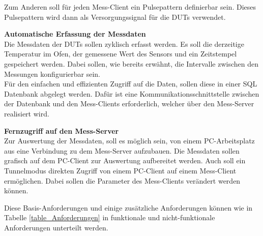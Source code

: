 Zum Anderen soll für jeden Mess-Client ein Pulsepattern definierbar sein. Dieses Pulsepattern wird dann als Versorgungssignal für die \acp{DUT} verwendet.

\textbf{Automatische Erfassung der Messdaten}\\
Die Messdaten der \acp{DUT} sollen zyklisch erfasst werden. Es soll die derzeitige Temperatur im Ofen, der gemessene Wert des Sensors und ein Zeitstempel gespeichert werden. Dabei sollen, wie bereits erwähnt, die Intervalle zwischen den Messungen konfigurierbar sein.\\
Für den einfachen und effizienten Zugriff auf die Daten, sollen diese in einer \ac{SQL} Datenbank abgelegt werden. Dafür ist eine Kommunikationsschnittstelle zwischen der Datenbank und den Mess-Clients erforderlich, welcher über den Mess-Server realisiert wird.

\textbf{Fernzugriff auf den Mess-Server}\\
Zur Auswertung der Messdaten, soll es möglich sein, von einem PC-Arbeitsplatz aus eine Verbindung zu dem Mess-Server aufzubauen. Die Messdaten sollen grafisch auf dem PC-Client zur Auswertung aufbereitet werden.
Auch soll ein Tunnelmodus direkten Zugriff von einem PC-Client auf einem Mess-Client ermöglichen. Dabei sollen die Parameter des Mess-Clients verändert werden können.

Diese Basis-Anforderungen und einige zusätzliche Anforderungen können wie in Tabelle \ref{table_Anforderungen} in funktionale und nicht-funktionale Anforderungen unterteilt werden.



